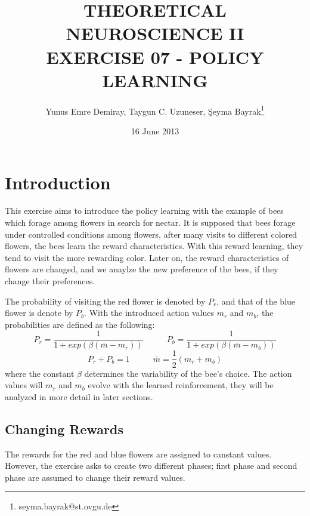\documentclass{article}
\begin{document}
\title{THEORETICAL NEUROSCIENCE II \\ EXERCISE 07 - POLICY LEARNING}
\date{16 June 2013}
\author[1]{Yunus Emre Demiray, Taygun C. Uzuneser, \c{S}eyma Bayrak\thanks{seyma.bayrak@st.ovgu.de}}
\maketitle

\newpage

\section{Introduction}

This exercise aims to introduce the policy learning with the example of bees which forage among flowers in search for nectar. It is supposed that bees forage under controlled conditions among flowers, after many visits to different colored flowers, the bees learn the reward characteristics. With this reward learning, they tend to visit the more rewarding color. Later on, the reward characteristics of flowers are changed, and we anaylze the new preference of the bees, if they change their preferences. 

The probability of visiting the red flower is denoted by $P_r$, and that of the blue flower is denote by $P_b$. With the introduced action values $m_r$ and $m_b$, the probabilities are defined as the following:
\begin{equation}
 P_r=\frac{1}{1+exp(\beta ({\bar m}-m_r))} \;\;\;\;\;\;\;\;\;\; P_b=\frac{1}{1+exp(\beta ({\bar m}-m_b))}
\end{equation}
\begin{equation}
  P_r+P_b=1\;\;\;\;\;\;\;\;\;\; {\bar m}=\frac{1}{2}(m_r+m_b)
\end{equation}
where the constant $\beta$ determines the variability of the bee's choice. The action values will $m_r$ and $m_b$ evolve with the learned reinforcement, they will be analyzed in more detail in later sections. 

\subsection{Changing Rewards}
The rewards for the red and blue flowers are assigned to canstant values. However, the exercise asks to create two different phases; first phase and second phase are assumed to change their reward values. 
\end{document}
